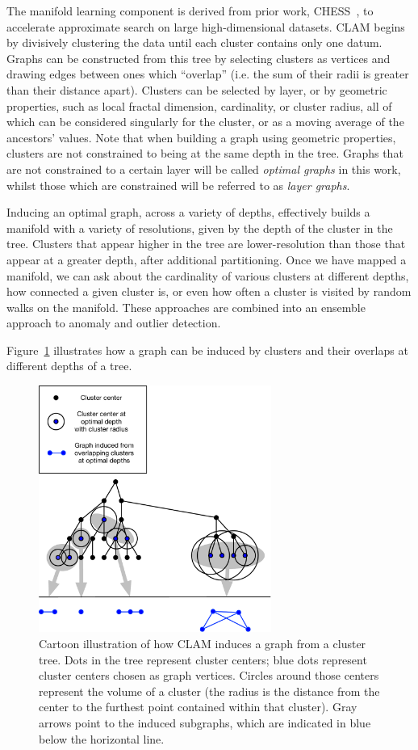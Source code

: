 The manifold learning component is derived from prior work, CHESS~\cite{ishaq2019entropy}, to accelerate approximate search on large high-dimensional datasets.
CLAM begins by divisively clustering the data until each cluster contains only one datum.
Graphs can be constructed from this tree by selecting clusters as vertices and drawing edges between ones which ``overlap'' (i.e. the sum of their radii is greater than their distance apart).
Clusters can be selected by layer, or by geometric properties, such as local fractal dimension, cardinality, or cluster radius, all of which can be considered singularly for the cluster, or as a moving average of the ancestors' values.
Note that when building a graph using geometric properties, clusters are not constrained to being at the same depth in the tree.
Graphs that are not constrained to a certain layer will be called \textit{optimal graphs} in this work, whilst those which are constrained will be referred to as \textit{layer graphs}.

Inducing an optimal graph, across a variety of depths, effectively builds a manifold with a variety of resolutions, given by the depth of the cluster in the tree.
Clusters that appear higher in the tree are lower-resolution than those that appear at a greater depth, after additional partitioning.
Once we have mapped a manifold, we can ask about the cardinality of various clusters at different depths, how connected a given cluster is, or even how often a cluster is visited by random walks on the manifold.
These approaches are combined into an ensemble approach to anomaly and outlier detection.

Figure~\ref{fig:introduction:graph-generation} illustrates how a graph can be induced by clusters and their overlaps at different depths of a tree.

\begin{figure}[ht!]
    \centering
    \includegraphics[width=3in]{images/tree-graph.pdf}
    \caption{Cartoon illustration of how CLAM induces a graph from a cluster tree.
        Dots in the tree represent cluster centers;
        blue dots represent cluster centers chosen as graph vertices.
        Circles around those centers represent the volume of a cluster (the radius is the distance from the center to the furthest point contained within that cluster).
        Gray arrows point to the induced subgraphs, which are indicated in blue below the horizontal line.}
    \label{fig:introduction:graph-generation}
\end{figure}

